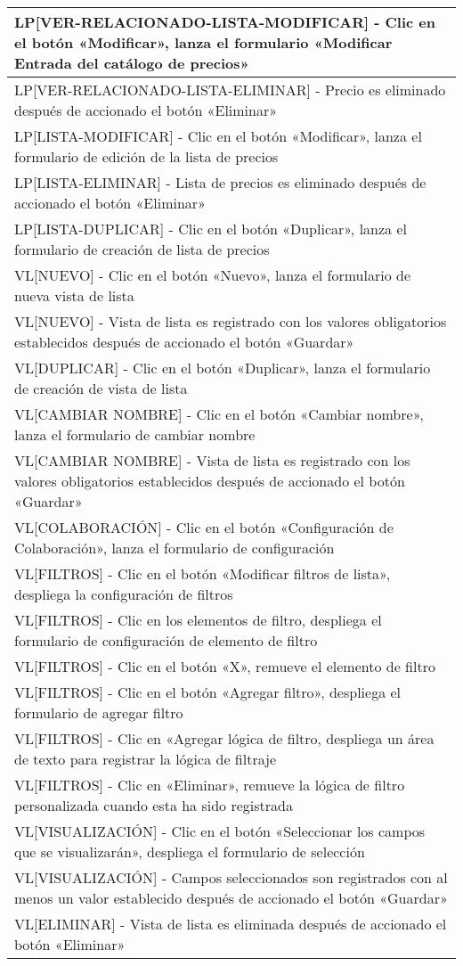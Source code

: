 \begin{longtable}{|p{15.0cm}|}
LP[VER-RELACIONADO-LISTA-MODIFICAR] - 		Clic en el botón «Modificar», lanza el formulario «Modificar Entrada del catálogo de precios» \\ \hline
LP[VER-RELACIONADO-LISTA-ELIMINAR] - 		Precio es eliminado después de accionado el botón «Eliminar» \\ \hline
LP[LISTA-MODIFICAR] - 		Clic en el botón «Modificar», lanza el formulario de edición de la lista de precios \\ \hline
LP[LISTA-ELIMINAR] - 		Lista de precios es eliminado después de accionado el botón «Eliminar» \\ \hline
LP[LISTA-DUPLICAR] - 		Clic en el botón «Duplicar», lanza el formulario de creación de lista de precios \\ \hline
VL[NUEVO] - 		Clic en el botón «Nuevo», lanza el formulario de nueva vista de lista \\ \hline
VL[NUEVO] - 		Vista de lista es registrado con los valores obligatorios establecidos después de accionado el botón «Guardar» \\ \hline
VL[DUPLICAR] - 		Clic en el botón «Duplicar», lanza el formulario de creación de vista de lista \\ \hline
VL[CAMBIAR NOMBRE] - 		Clic en el botón «Cambiar nombre», lanza el formulario de cambiar nombre \\ \hline
VL[CAMBIAR NOMBRE] - 		Vista de lista es registrado con los valores obligatorios establecidos después de accionado el botón «Guardar» \\ \hline
VL[COLABORACIÓN] - 		Clic en el botón «Configuración de Colaboración», lanza el formulario de configuración \\ \hline
VL[FILTROS] - 		Clic en el botón «Modificar filtros de lista», despliega la configuración de filtros \\ \hline
VL[FILTROS] - 		Clic en los elementos de filtro, despliega el formulario de configuración de elemento de filtro \\ \hline
VL[FILTROS] - 		Clic en el botón «X», remueve el elemento de filtro \\ \hline
VL[FILTROS] - 		Clic en el botón «Agregar filtro», despliega el formulario de agregar filtro \\ \hline
VL[FILTROS] - 		Clic en «Agregar lógica de filtro, despliega un área de texto para registrar la lógica de filtraje \\ \hline
VL[FILTROS] - 		Clic en «Eliminar», remueve la lógica de filtro personalizada cuando esta ha sido registrada \\ \hline
VL[VISUALIZACIÓN] - 		Clic en el botón «Seleccionar los campos que se visualizarán», despliega el formulario de selección \\ \hline
VL[VISUALIZACIÓN] - 		Campos seleccionados son registrados con al menos un valor establecido después de accionado el botón «Guardar» \\ \hline
VL[ELIMINAR] - 		Vista de lista es eliminada después de accionado el botón «Eliminar» \\ \hline
\end{longtable}

